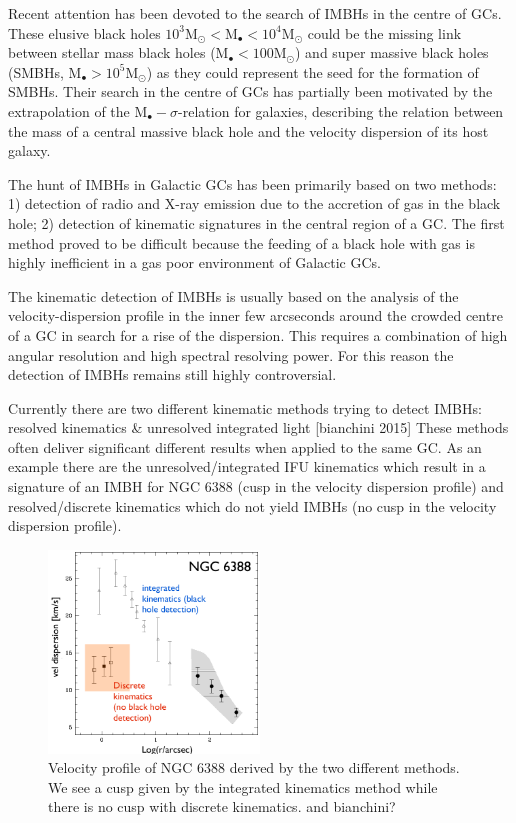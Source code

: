 \par Recent attention has been devoted to the search of \acp{IMBH} in the centre of \acp{GC}. These elusive black holes \(10^3 \mathrm{M}_\odot < \mathrm{M}_\bullet < 10^4 \mathrm{M}_\odot\) could be the missing link between stellar mass black holes (\(\mathrm{M}_\bullet < 100 \mathrm{M}_\odot\)) and super massive black holes (\acsp{SMBH}, \(\mathrm{M}_\bullet > 10^5 \mathrm{M}_\odot\)) as they could represent the seed for the formation of \acp{SMBH}. Their search in the centre of \acp{GC} has partially been motivated by the extrapolation of the \(\mathrm{M}_\bullet-\sigma\)-relation for galaxies, describing the relation between the mass of a central massive black hole and the velocity dispersion of its host galaxy.
\par The hunt of \acp{IMBH} in Galactic \acp{GC} has been primarily based on two methods: 1) detection of radio and X-ray emission due to the accretion of gas in the black hole; 2) detection of kinematic signatures in the central region of a \ac{GC}. The first method proved to be difficult because the feeding of a black hole with gas is highly inefficient in a gas poor environment of Galactic \acp{GC}. 
\par The kinematic detection of \acp{IMBH} is usually based on the analysis of the velocity-dispersion profile in the inner few arcseconds around the crowded centre of a \ac{GC} in search for a rise of the dispersion. This requires a combination of high angular resolution and high spectral resolving power. For this reason the detection of \acp{IMBH} remains still highly controversial. 
\par Currently there are two different kinematic methods trying to detect \acp{IMBH}: \color{red} resolved kinematics \& unresolved integrated light [bianchini 2015] \cite{2015MNRAS.453..365B} \color{black} These methods often deliver significant different results when applied to the same \ac{GC}. As an example there are the unresolved/integrated IFU kinematics which result in a signature of an \ac{IMBH} for NGC 6388 (cusp in the velocity dispersion profile) and resolved/discrete kinematics which do not yield \acp{IMBH} (no cusp in the velocity dispersion profile). 
\begin{figure}
\centering
\includegraphics[width=0.5\textwidth]{Plots/Paolo_talk_plot.png}
\caption{Velocity profile of NGC 6388 derived by the two different methods. We see a cusp given by the integrated kinematics method while there is no cusp with discrete kinematics. \citep{2013ApJ...769..107L} \color{red}and bianchini?\color{black}}
\label{fig:NGC6388}
\end{figure}\
